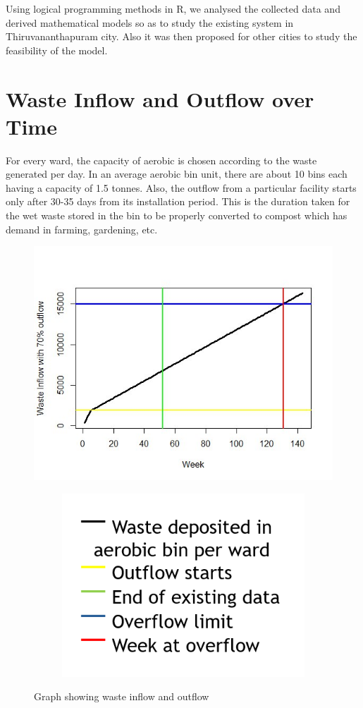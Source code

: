 \documentclass[12pt,a4paper]{report}
\begin{document}
Using logical programming methods in R, we analysed the collected data and derived mathematical models so as to study the existing system in Thiruvananthapuram city. Also it was then proposed for other cities to study the feasibility of the model.
	
\section{Waste Inflow and Outflow over Time}

For every ward, the capacity of aerobic is chosen according to the waste generated per day. In an average aerobic bin unit, there are about 10 bins each having a capacity of 1.5 tonnes. Also, the outflow from a particular facility starts only after 30-35 days from its installation period. This is the duration taken for the wet waste stored in the bin to be properly converted to compost which has demand in farming, gardening, etc.

\begin{figure}[H]
	\centering
	\includegraphics[width=0.6\linewidth]{waste_inflow_outflow}
	\begin{subfigure}{.15\textwidth}
		\centering
		\includegraphics[width=1\linewidth]{inflow_outflow_label}
	\end{subfigure}
	\caption{Graph showing waste inflow and outflow}
	\label{fig:wasteinflowoutflow}
\end{figure}
\end{document}
